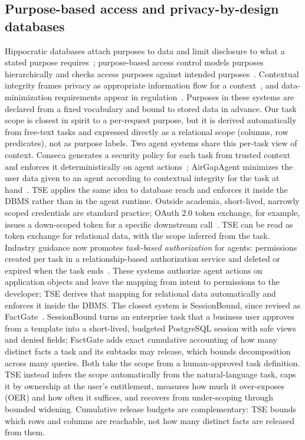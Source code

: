 \subsection{Purpose-based access and privacy-by-design databases}
Hippocratic databases attach purposes to data and limit disclosure to what a stated purpose
requires~\cite{agrawal2002hippocratic,lefevre2004limiting}; purpose-based access control models purposes
hierarchically and checks access purposes against intended purposes~\cite{byun2008purpose}. Contextual
integrity frames privacy as appropriate information flow for a context~\cite{barth2006contextual}, and
data-minimization requirements appear in regulation~\cite{gdpr2016}. Purposes in these systems are
declared from a fixed vocabulary and bound to stored data in advance. Our task scope is closest in spirit
to a per-request purpose, but it is derived automatically from free-text tasks and expressed directly as a
relational scope (columns, row predicates), not as purpose labels. Two agent systems share this per-task view of
context. Conseca generates a security policy for each task from trusted context and enforces it deterministically on
agent actions~\cite{tsai2025conseca}; AirGapAgent minimizes the user data given to an agent according to contextual
integrity for the task at hand~\cite{bagdasarian2024airgapagent}. TSE applies the same idea to database reach and
enforces it inside the DBMS rather than in the agent runtime. Outside academia, short-lived, narrowly scoped
credentials are standard practice; OAuth 2.0 token exchange, for example, issues a down-scoped token for a specific
downstream call~\cite{rfc8693}. TSE can be read as token exchange for relational data, with the scope inferred from
the task. Industry guidance now promotes \emph{task-based authorization} for agents: permissions created per task in
a relationship-based authorization service and deleted or expired when the task ends~\cite{openfga2026task,stabile2026intent}.
These systems authorize agent actions on application objects and leave the mapping from intent to permissions to
the developer; TSE derives that mapping for relational data automatically and enforces it inside the DBMS. The
closest system is SessionBound, since revised as FactGate~\cite{wu2026factgate}. SessionBound turns an enterprise
task that a business user approves from a template into a short-lived, budgeted PostgreSQL session with safe views
and denied fields; FactGate adds exact cumulative accounting of how many distinct facts a task and its subtasks may
release, which bounds decomposition across many queries. Both take the scope from a human-approved task definition.
TSE instead infers the scope automatically from the natural-language task, caps it by ownership at the user's
entitlement, measures how much it over-exposes (OER) and how often it suffices, and recovers from under-scoping
through bounded widening. Cumulative release budgets are complementary: TSE bounds which rows and columns are
reachable, not how many distinct facts are released from them.

